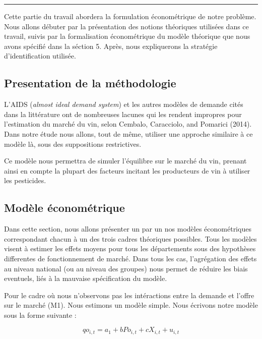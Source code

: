 \documentclass[11pt,]{article}
\begin{document}
\rule[0.5ex]{\linewidth}{1pt}

Cette partie du travail abordera la formulation économétrique de notre
problème. Nous allons débuter par la présentation des notions théoriques
utilisées dans ce travail, suivis par la formalisation économétrique du
modèle théorique que nous avons spécifié dans la séction 5. Après, nous
expliquerons la stratégie d'identification utilisée.

\hypertarget{presentation-de-la-methodologie}{%
\subsection{Presentation de la
méthodologie}\label{presentation-de-la-methodologie}}

L'AIDS (\emph{almost ideal demand system}) et les autres modèles de
demande cités dans la littérature ont de nombreuses lacunes qui les
rendent impropres pour l'estimation du marché du vin, selon Cembalo,
Caracciolo, and Pomarici (2014). Dans notre étude nous allons, tout de
même, utiliser une approche similaire à ce modèle là, sous des
suppositions restrictives.

Ce modèle nous permettra de simuler l'équilibre sur le marché du vin,
prenant ainsi en compte la plupart des facteurs incitant les producteurs
de vin à utiliser les pesticides.

\hypertarget{modele-econometrique}{%
\subsection{Modèle économétrique}\label{modele-econometrique}}

Dans cette section, nous allons présenter un par un nos modèles
économétriques correspondant chacun à un des trois cadres théoriques
possibles. Tous les modèles visent à estimer les effets moyens pour tous
les départements sous des hypothèses differentes de fonctionnement de
marché. Dans tous les cas, l'agrégation des effets au niveau national
(ou au niveau des groupes) nous permet de réduire les biais eventuels,
liés à la mauvaise spécification du modèle.

Pour le cadre où nous n'observons pas les intéractions entre la demande
et l'offre sur le marché (M1). Nous estimons un modèle simple. Nous
écrivons notre modèle sous la forme suivante :

\begin{equation*}
  qo_{i,t} = a_1 + b Po_{i,t} + c X_{i,t} + u_{i,t}
\end{equation*}
\end{document}
